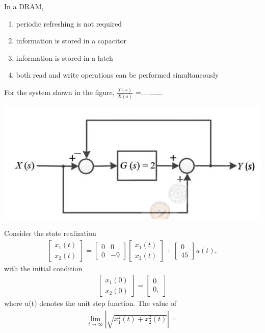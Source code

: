 \item In a DRAM,
\begin{enumerate}
\item periodic refreshing is not required 
\item information is stored in a capacitor
\item information is stored in a latch
\item both read and write operations can be performed simultaneously
\end{enumerate}

\item For the system shown in the figure, $\frac{Y(s)}{X(s)}$ =...........

\includegraphics[scale=0.3]{18}

\item Consider the state realization
\begin{align*} 
\begin{bmatrix} 
x_{1}(t) \\ x_{2}(t)
\end{bmatrix} = 
\begin{bmatrix}
0 & 0 \\ 0 & -9
\end{bmatrix}
\begin{bmatrix}
x_{1}(t) \\ x_{2}(t)
\end{bmatrix} +
\begin{bmatrix}
0 \\ 45
\end{bmatrix}
u(t), 
\end{align*}
with the initial condition
\begin{align*} 
\begin{bmatrix}
x_{1}(0) \\ x_{2}(0)
\end{bmatrix} =
\begin{bmatrix}
0 \\ 0,
\end{bmatrix}
\end{align*}
where u(t) denotes the unit step function. The value of
\begin{align*}
\lim_{t \to \infty}|\sqrt{x^{2}_{1}(t) + x^{2}_{2}(t)}| = 
\end{align*}

